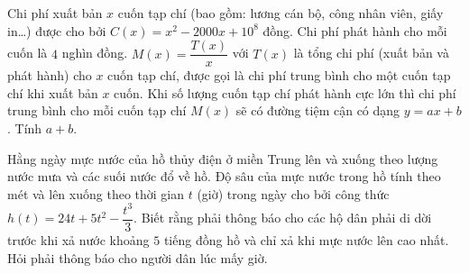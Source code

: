 \begin{bt}%
Chi phí xuất bản $x$ cuốn tạp chí (bao gồm: lương cán bộ, công nhân viên, giấy in\ldots) được cho bởi $C(x)=x^2-2000 x+10^8$ đồng. Chi phí phát hành cho mỗi cuốn là $4$ nghìn đồng. $M(x)=\dfrac{T(x)}{x}$ với $T(x)$ là tổng chi phí (xuất bản và phát hành) cho $x$ cuốn tạp chí, được gọi là chi phí trung bình cho một cuốn tạp chí khi xuất bản $x$ cuốn. Khi số lượng cuốn tạp chí phát hành cực lớn thì chi phí trung bình cho mỗi cuốn tạp chí $M(x)$ sẽ có đường tiệm cận có dạng $y=ax+b$. Tính $a+b$.
\end{bt}

\begin{bt}%
	Hằng ngày mực nước của hồ thủy điện ở miền Trung lên và xuống theo lượng nước mưa và các suối nước đổ về hồ. Độ sâu của mực nước trong hồ tính theo mét và lên xuống theo thời gian $t$ (giờ) trong ngày cho bởi công thức $h(t)=24t+5t^2-\dfrac{t^3}{3}$. Biết rằng phải thông báo cho các hộ dân phải di dời trước khi xả nước khoảng $5$ tiếng đồng hồ và chỉ xả khi mực nước lên cao nhất. Hỏi phải thông báo cho người dân lúc mấy giờ. 
\end{bt}

